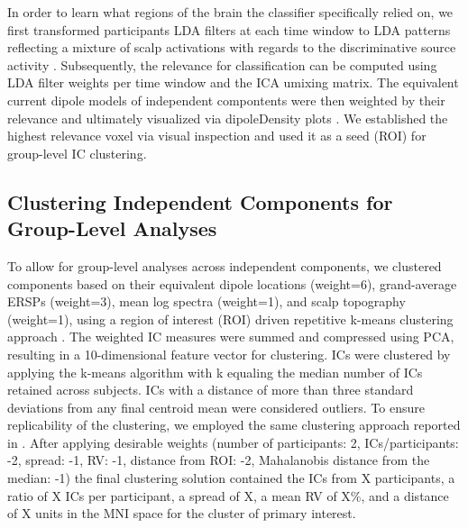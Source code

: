 In order to learn what regions of the brain the classifier specifically relied on, we first transformed participants LDA filters at each time window to LDA patterns reflecting a mixture of scalp activations with regards to the discriminative source activity \cite{Haufe2014a, Zander2016, Krol2019}. Subsequently, the relevance for classification can be computed using LDA filter weights per time window and the ICA umixing matrix. The equivalent current dipole models of independent compontents were then weighted by their relevance and ultimately visualized via dipoleDensity plots \cite{}. We established the highest relevance voxel via visual inspection and used it as a seed (ROI) for group-level IC clustering.

\subsection{Clustering Independent Components for Group-Level Analyses}
To allow for group-level analyses across independent components, we clustered components based on their equivalent dipole locations (weight=6), grand-average ERSPs (weight=3), mean log spectra (weight=1), and scalp topography (weight=1), using a region of interest (ROI) driven repetitive k-means clustering approach \cite{Gramann2018}. The weighted IC measures were summed and compressed using PCA, resulting in a 10-dimensional feature vector for clustering. ICs were clustered by applying the k-means algorithm with k equaling the median number of ICs retained across subjects. ICs with a distance of more than three standard deviations from any final centroid mean were considered outliers. To ensure replicability of the clustering, we employed the same clustering approach reported in \cite{Gramann2018}. After applying desirable weights (number of participants: 2, ICs/participants: -2, spread: -1, RV: -1, distance from ROI: -2, Mahalanobis distance from the median: -1) the final clustering solution contained the ICs from X participants, a ratio of X ICs per participant, a spread of X, a mean RV of X\%, and a distance of X units in the MNI space for the cluster of primary interest.
